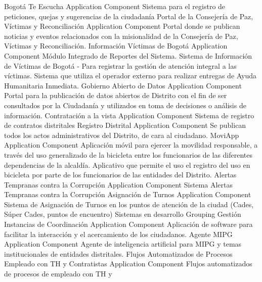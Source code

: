 \documentclass[
	a4paper, %
	12pt, %
]{include/CSSullivanBusinessReport}
\begin{document}
\textbar{} \textbar{} Bogotá Te Escucha \textbar{} Application Component
\textbar{} Sistema para el registro de peticiones, quejas y sugerencias
de la ciudadanía \textbar{} \textbar{} Portal de la Consejería de Paz,
Víctimas y Reconciliación \textbar{} Application Component \textbar{}
Portal donde se publican noticias y eventos relacionados con la
misionalidad de la Consejería de Paz, Víctimas y Reconciliación.
\textbar{} \textbar{} Información Víctimas de Bogotá \textbar{}
Application Component \textbar{} Módulo Integrado de Reportes del
Sistema. Sistema de Información de Víctimas de Bogotá - Para registrar
la gestión de atención integral a las víctimas. Sistema que utiliza el
operador externo para realizar entregas de Ayuda Humanitaria Inmediata.
\textbar{} \textbar{} Gobierno Abierto de Datos \textbar{} Application
Component \textbar{} Portal para la publicación de datos abiertos de
Distrito con el fin de ser consultados por la Ciudadanía y utilizados en
toma de decisiones o análisis de información. \textbar{} \textbar{}
Contratación a la vista \textbar{} Application Component \textbar{}
Sistema de registro de contratos distritales \textbar{} \textbar{}
Registro Distrital \textbar{} Application Component \textbar{} Se
publican todos los actos administrativos del Distrito, de cara al
ciudadano. \textbar{} \textbar{} MoviApp \textbar{} Application
Component \textbar{} Aplicación móvil para ejercer la movilidad
responsable, a través del uso generalizado de la bicicleta entre los
funcionarios de las diferentes dependencias de la alcaldía. Aplicativo
que permite el uso el registro del uso en bicicleta por parte de los
funcionarios de las entidades del Distrito. \textbar{} \textbar{}
Alertas Tempranas contra la Corrupción \textbar{} Application Component
\textbar{} Sistema Alertas Tempranas contra la Corrupción \textbar{}
\textbar{} Asignación de Turnos \textbar{} Application Component
\textbar{} Sistema de Asignación de Turnos en los puntos de atención de
la ciudad (Cades, Súper Cades, puntos de encuentro) \textbar{}
\textbar{} Sistemas en desarrollo \textbar{} Grouping \textbar{}
\textbar{} \textbar{} Gestión Instancias de Coordinación \textbar{}
Application Component \textbar{} Aplicación de software para facilitar
la interacción y el acercamiento de los ciudadanos. \textbar{}
\textbar{} Agente MIPG \textbar{} Application Component \textbar{}
Agente de inteligencia artificial para MIPG y temas institucionales de
entidades distritales. \textbar{} \textbar{} Flujos Automatizados de
Procesos Empleado con TH y Contratistas \textbar{} Application Component
\textbar{} Flujos automatizados de procesos de empleado con TH y
\end{document}
